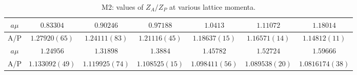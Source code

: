 \begin{table}[h!]
\begin{center}
\caption{M2: values of $Z_A/Z_P$ at various lattice momenta.}
\begin{tabular}{c|c c c c c c}
\hline
\hline
$a\mu$ & $0.83304$ & $0.90246$ & $0.97188$ & $1.0413$ & $1.11072$ & $1.18014$ \\
\hline
A/P & $1.27920(65)$ & $1.24111(83)$ & $1.21116(45)$ & $1.18637(15)$ & $1.16571(14)$ & $1.14812(11)$ \\
\hline
$a\mu$ & $1.24956$ & $1.31898$ & $1.3884$ & $1.45782$ & $1.52724$ & $1.59666$ \\
\hline
A/P & $1.133092(49)$ & $1.119925(74)$ & $1.108525(15)$ & $1.098411(56)$ & $1.089538(20)$ & $1.0816174(38)$ \\
\hline
\hline
\end{tabular}
\end{center}
\end{table}